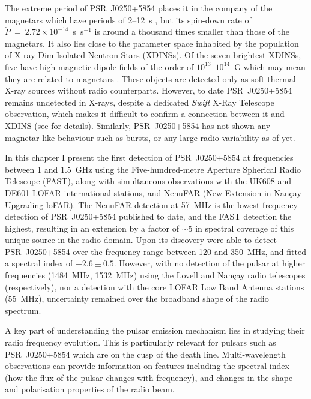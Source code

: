 The extreme period of PSR~J0250+5854 places it in the company of the magnetars which have periods of 2--12~s \citep{OKxx2014}, but its spin-down rate of $\dot{P}~=~2.72\times10^{-14}$~s~s$^{-1}$ is around a thousand times smaller than those of the magnetars.  It also lies close to the parameter space inhabited by the population of X-ray Dim Isolated Neutron Stars (XDINSs). Of the seven brightest XDINSs, five have high magnetic dipole fields of the order of $10^{13}$--$10^{14}$~G which may mean they are related to magnetars \citep[][see Sec~\ref{sec: intro - general intro - pulsar population}]{Hxxx2007, KKxx2007}. These objects are detected only as soft thermal X-ray sources without radio counterparts. However, to date PSR~J0250+5854 remains undetected in X-rays, despite a dedicated \textit{Swift} X-Ray Telescope observation, which makes it difficult to confirm a connection between it and XDINS (see \citealt{TBC+2018} for details). Similarly, PSR~J0250+5854 has not shown any magnetar-like behaviour such as bursts, or any large radio variability as of yet.


In this chapter I present the first detection of PSR~J0250+5854 at frequencies between 1 and 1.5~GHz using the Five-hundred-metre Aperture Spherical Radio Telescope (FAST), along with simultaneous observations with the UK608 and DE601 LOFAR international stations, and NenuFAR (New Extension in Nan\c{c}ay Upgrading loFAR). The NenuFAR detection at 57~MHz is the lowest frequency detection of PSR~J0250+5854 published to date, and the FAST detection the highest, resulting in an extension by a factor of $\sim$5 in spectral coverage of this unique source in the radio domain. Upon its discovery \citet{TBC+2018} were able to detect PSR~J0250+5854 over the frequency range between 120 and 350~MHz, and fitted a spectral index of $-2.6\pm0.5$. However, with no detection of the pulsar at higher frequencies (1484~MHz, 1532~MHz) using the Lovell and Nan\c{c}ay radio telescopes (respectively), nor a detection with the core LOFAR Low Band Antenna stations (55~MHz), uncertainty remained over the broadband shape of the radio spectrum. 


A key part of understanding the pulsar emission mechanism lies in studying their radio frequency evolution. This is particularly relevant for pulsars such as PSR~J0250+5854 which are on the cusp of the death line. Multi-wavelength observations can provide information on features including the spectral index (how the flux of the pulsar changes with frequency), and changes in the shape and polarisation properties of the radio beam.

